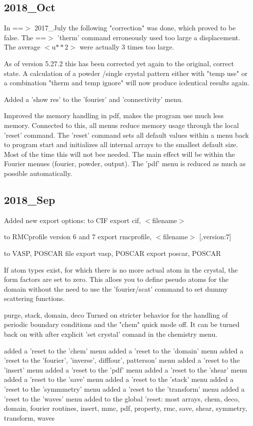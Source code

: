 \subsection*{2018\_Oct}
\par
In ==$> $ 2017\_July the following "correction" was done, which proved 
to be false. 
The ==$> $ 'therm' command erroneously used too large a displacement. 
The average $ <$u$**$2$> $ were actually 3 times too large. 
\par
As of version 5.27.2 this has been corrected yet again to the 
original, correct state. A calculation of a powder /single crystal 
pattern either with "temp use" or a combination "therm and temp ignore" 
will now produce icdentical results again. 
\par
Added a 'show res' to the 'fourier' and 'connectivity' menu. 
\par
Improved the memory handling in pdf, makes the program use much 
less memory. 
Connected to this, all menus reduce memory usage through the 
local 'reset' command. The 'reset' command sets all default 
values within a menu back to program start and initializes all 
internal arrays to the smallest default size. Most of the time 
this will not bee needed. The main effect will be within the 
Fourier menues (fourier, powder, output). The 'pdf' menu is 
reduced as much as possible automatically. 
\par
\subsection*{2018\_Sep}
\par
Added new export options: 
to CIF 
export cif, $ <$filename$> $ 
\par
to RMCprofile version 6 and 7 
export rmcprofile, $ <$filename$> $ [,version:7] 
\par
to VASP, POSCAR file 
export vasp, POSCAR 
export poscar, POSCAR 
\par
If atom types exist, for which there is no more actual atom in 
the crystal, the form factors are set to zero. This alloes you 
to define pseudo atoms for the domain without the need to 
use the 'fourier/scat' command to set dummy scattering 
functions. 
\par
purge, stack, domain, deco 
   Turned on stricter behavior for the handling of 
   periodic boundary conditions and the "chem" quick mode 
   off. It can be turned back on with after explicit 
   'set crystal' comand in the chemistry menu. 
\par
added a 'reset to the 'chem' menu 
added a 'reset to the 'domain' menu 
added a 'reset to the 'fourier', 'inverse', difffour', patterson' menu 
added a 'reset to the 'insert' menu 
added a 'reset to the 'pdf' menu 
added a 'reset to the 'shear' menu 
added a 'reset to the 'save' menu 
added a 'reset to the 'stack' menu 
added a 'reset to the 'symmmetry' menu 
added a 'reset to the 'transform' menu 
added a 'reset to the 'waves' menu 
added to the global 'reset: 
    most arrays, chem, deco, domain, fourier routines, insert, mmc, 
    pdf, property, rmc, save, shear, symmetry, transform, waves 
\par
